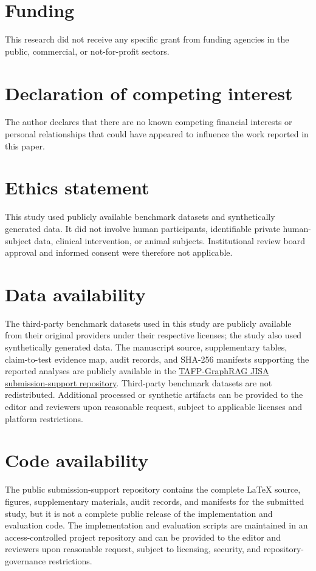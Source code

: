 \documentclass[preprint,12pt]{elsarticle}
\begin{document}
\section*{Funding}
This research did not receive any specific grant from funding agencies in the public, commercial, or not-for-profit sectors.

\section*{Declaration of competing interest}
The author declares that there are no known competing financial interests or personal relationships that could have appeared to influence the work reported in this paper.

\section*{Ethics statement}
This study used publicly available benchmark datasets and synthetically generated data. It did not involve human participants, identifiable private human-subject data, clinical intervention, or animal subjects. Institutional review board approval and informed consent were therefore not applicable.

\section*{Data availability}
The third-party benchmark datasets used in this study are publicly available from their original providers under their respective licenses; the study also used synthetically generated data. The manuscript source, supplementary tables, claim-to-test evidence map, audit records, and SHA-256 manifests supporting the reported analyses are publicly available in the \href{https://github.com/ylmzvrl/tafp-graphrag-jisa-submission}{TAFP-GraphRAG JISA submission-support repository}. Third-party benchmark datasets are not redistributed. Additional processed or synthetic artifacts can be provided to the editor and reviewers upon reasonable request, subject to applicable licenses and platform restrictions.

\section*{Code availability}
The public submission-support repository contains the complete LaTeX source, figures, supplementary materials, audit records, and manifests for the submitted study, but it is not a complete public release of the implementation and evaluation code. The implementation and evaluation scripts are maintained in an access-controlled project repository and can be provided to the editor and reviewers upon reasonable request, subject to licensing, security, and repository-governance restrictions.
\end{document}

